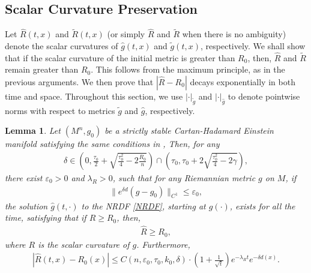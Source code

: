 \documentclass[12pt]{amsart}
\newtheorem{lemma}{Lemma}[section]
\begin{document}
\subsection{Scalar Curvature Preservation}
Let \(\hat R(t,x)\) and \(\tilde R(t,x)\) (or simply \(\hat R\) and \(\tilde R\) when there is no ambiguity) denote the scalar curvatures of \(\hat g(t,x)\) and \(\tilde g(t,x)\), respectively. We shall show that if the scalar curvature of the initial metric is greater than \(R_0\), then, \(\hat R\) and \(\tilde R\) remain greater than \(R_0\). This follows from the maximum principle, as in the previous arguments. We then prove that $|\hat R - R_0|$ decays exponentially in both time and space. Throughout this section, we use $|\cdot|_{\tilde{g}}$ and $|\cdot|_{\hat{g}}$ to denote pointwise norms with respect to metrics $\tilde{g}$ and $\hat{g}$, respectively.
\begin{lemma}\label{The evolution equation of the scalar curvature}
    Let $(M^n, g_0)$ be a strictly stable Cartan-Hadamard Einstein manifold satisfying the same conditions in , Then, for any 
     \begin{align*}
        \delta \in \left( 0, \frac{\tau_0}{2} + \sqrt{\frac{\tau_0^2}{4} - 2\frac{R_0}{n}} \right) \cap \left( \tau_0, \tau_0 + 2\sqrt{\frac{\tau_0^2}{4} - 2\gamma} \right),
    \end{align*}
    there exist $\varepsilon_0 > 0$ and $\lambda_R > 0$, such that for any Riemannian metric $g$ on $M$, if 
    \begin{align*}
         \|e^{\delta d}(g - g_0)\|_{C^1} \leq \varepsilon_0,
    \end{align*}
    the solution $\hat{g}(t, \cdot)$ to the NRDF \eqref{NRDF}, starting at $g(\cdot)$, exists for all the time, satisfying that if $R \geq R_0$, then, 
    \begin{align}\label{The inequality of the scalar curvature}
        \hat{R} \geq R_0,
    \end{align}
    where $R$ is the scalar curvature of $g$. Furthermore,
    \begin{align}\label{scalar curvature estimate with weight}
        |\hat{R}(t, x) - R_0(x)|\leq C(n,\varepsilon_0,\tau_0, k_0, \delta)\cdot (1 + \frac{1}{\sqrt{t}}) e^{-\lambda_R t} e^{-\delta d(x)}.
    \end{align} 
\end{lemma}
\end{document}
